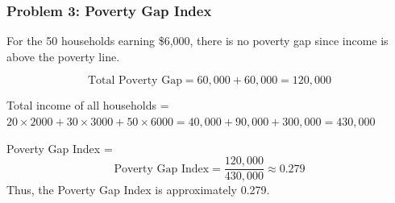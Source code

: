 \documentclass{beamer}
\begin{document}
\begin{frame}
\frametitle{Problem 3: Poverty Gap Index}


For the 50 households earning \$6,000, there is no poverty gap since income is above the poverty line.

\[
\text{Total Poverty Gap} = 60,000 + 60,000 = 120,000
\]

Total income of all households = \( 20 \times 2000 + 30 \times 3000 + 50 \times 6000 = 40,000 + 90,000 + 300,000 = 430,000 \)

Poverty Gap Index =  
\[
\text{Poverty Gap Index} = \frac{120,000}{430,000} \approx 0.279
\]
Thus, the Poverty Gap Index is approximately 0.279.

\end{frame}
\end{document}
